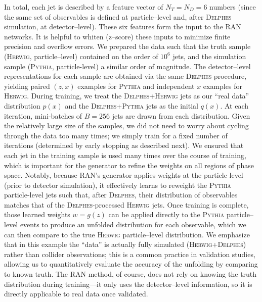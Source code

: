             In total, each jet is described by a feature vector of $N_T = N_D = 6$ numbers (since the same set of observables is defined at particle--level and, after \textsc{Delphes} simulation, at detector--level).
            These six features form the input to the RAN networks.
            It is helpful to whiten (z--score)\kd{} these inputs to minimize finite precision and overflow errors.
            We prepared the data such that the truth sample (\textsc{Herwig}, particle--level) contained on the order of $10^6$ jets, and the simulation sample (\textsc{Pythia}, particle-level) a similar order of magnitude.
            The detector--level representations for each sample are obtained via the same \textsc{Delphes} procedure, yielding paired $(z, x)$ examples for \textsc{Pythia} and independent $x$ examples for \textsc{Herwig}.
            During training, we treat the \textsc{Delphes+Herwig} jets as our “real data” distribution $p(x)$ and the \textsc{Delphes+Pythia} jets as the initial $q(x)$. %
            At each iteration, mini-batches of $B=256$ jets are drawn from each distribution.
            Given the relatively large size of the samples, we did not need to worry about cycling through the data too many times; we simply train for a fixed number of iterations (determined by early stopping as described next).
            We ensured that each jet in the training sample is used many times over the course of training, which is important for the generator to refine the weights on all regions of phase space.
            Notably, because RAN’s generator applies weights at the particle level (prior to detector simulation), it effectively learns to reweight the \textsc{Pythia} particle-level jets such that, after \textsc{Delphes}, their distribution of observables matches that of the \textsc{Delphes}-processed \textsc{Herwig} jets.
            Once training is complete, those learned weights $w = g(z)$ can be applied directly to the \textsc{Pythia} particle--level events to produce an unfolded distribution for each observable, which we can then compare to the true \textsc{Herwig} particle--level distribution.
            We emphasize that in this example the “data” is actually fully simulated (\textsc{Herwig+Delphes}) rather than collider observations;
            this is a common practice in validation studies, allowing us to quantitatively evaluate the accuracy of the unfolding by comparing to known truth.
            The RAN method, of course, does not rely on knowing the truth distribution during training—it only uses the detector--level information, so it is directly applicable to real data once validated.

